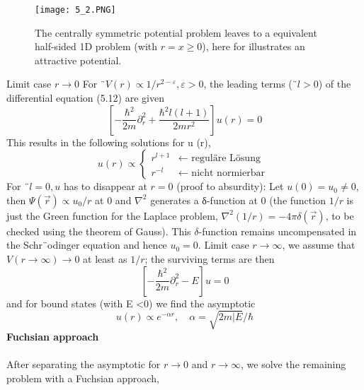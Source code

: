\begin{figure}[ht]
    \begin{minipage}{0.6\textwidth}
        \centering
        \texttt{[image: 5\_2.PNG]}
    \end{minipage}
    \begin{minipage}{0.3\textwidth}
        \caption{The centrally symmetric potential problem leaves to a equivalent half-sided 1D problem (with $r=x\geq 0$), here for illustrates an attractive potential.}
    \end{minipage}
\end{figure}
Limit case $r \rightarrow 0$ For ¨$V (r) \propto 1 / r^{2-\varepsilon}, \varepsilon> 0$, the leading terms (¨$l> 0$) of the differential equation (5.12) are given
\begin{equation}
    \left[-\frac{\hbar^{2}}{2 m} \partial_{r}^{2}+\frac{\hbar^{2} l(l+1)}{2 m r^{2}}\right] u(r)=0
    \end{equation}
This results in the following solutions for u (r),
\begin{equation}
u(r) \propto\left\{\begin{array}{ll}{r^{l+1}} & {\leftarrow \text { reguläre Lösung }} \\ {r^{-l}} & {\leftarrow \text { nicht normierbar }}\end{array}\right.
\end{equation}
For ¨$l = 0, u$ has to disappear at $r = 0$ (proof to absurdity): Let $u (0) = u_0 \neq 0$, then $\Psi (\vec{r}) \propto u_0 / r$ at $0$ and $\nabla^2$ generates a δ-function at 0 (the function $1 / r$ is just the Green function for the Laplace problem, $\nabla^2 (1 / r) = -4π\delta (\vec{r})$, to be checked using the theorem of Gauss). This $\delta$-function remains uncompensated in the Schr¨odinger equation and hence $u_0 = 0$.
Limit case $r\rightarrow\infty$, we assume that $V (r\rightarrow\infty) \rightarrow 0$ at least as $1 / r$; the surviving terms are then
\begin{equation}
    \left[-\frac{\hbar^{2}}{2 m} \partial_{r}^{2}-E\right] u=0
    \end{equation}
and for bound states (with E <0) we find the asymptotic
\begin{equation}
    u(r) \propto e^{-\alpha r}, \quad \alpha=\sqrt{2m|E}/\hbar
    \end{equation}
\textbf{Fuchsian approach}\\\\
After separating the asymptotic for $r\rightarrow 0$ and $r\rightarrow\infty$, we solve the remaining problem with a Fuchsian approach,

